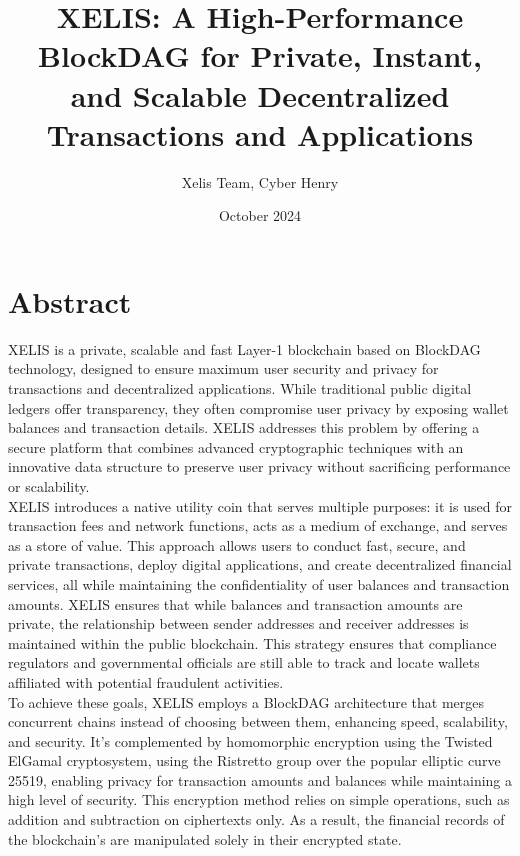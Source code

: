 \documentclass[10pt,a4paper,twocolumn]{article}
\title{XELIS: A High-Performance BlockDAG for Private, Instant, and Scalable Decentralized Transactions and Applications}
\author{Xelis Team, Cyber Henry}
\date{October 2024}
\begin{document}
\maketitle

\section{Abstract}


XELIS is a private, scalable and fast Layer-1 blockchain based on BlockDAG technology, designed to ensure maximum user security and privacy for transactions and decentralized applications. While traditional public digital ledgers offer transparency, they often compromise user privacy by exposing wallet balances and transaction details. XELIS addresses this problem by offering a secure platform that combines advanced cryptographic techniques with an innovative data structure to preserve user privacy without sacrificing performance or scalability.\\

XELIS introduces a native utility coin that serves multiple purposes: it is used for transaction fees and network functions, acts as a medium of exchange, and serves as a store of value. This approach allows users to conduct fast, secure, and private transactions, deploy digital applications, and create decentralized financial services, all while maintaining the confidentiality of user balances and transaction amounts. XELIS ensures that while balances and transaction amounts are private, the relationship between sender addresses and receiver addresses is maintained within the public blockchain. This strategy ensures that compliance regulators and governmental officials are still able to track and locate wallets affiliated with potential fraudulent activities.\\

To achieve these goals, XELIS employs a BlockDAG architecture that merges concurrent chains instead of choosing between them, enhancing speed, scalability, and security. It's complemented by homomorphic encryption using the Twisted ElGamal cryptosystem, using the Ristretto group over the popular elliptic curve 25519, enabling privacy for transaction amounts and balances while maintaining a high level of security. This encryption method relies on simple operations, such as addition and subtraction on ciphertexts only. As a result, the financial records of the blockchain's are manipulated solely in their encrypted state.\\
\end{document}
